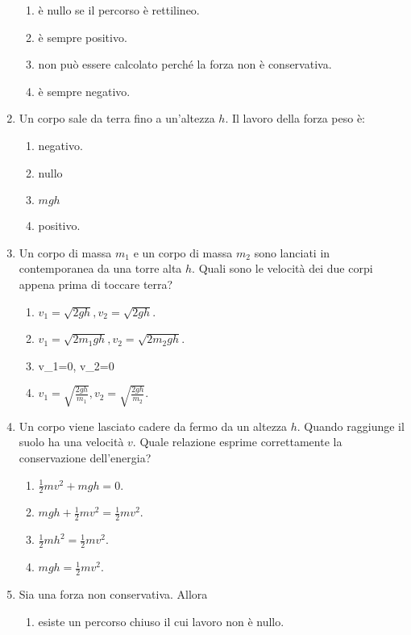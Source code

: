 \documentclass{article}
\begin{document}
\begin{enumerate}
  \begin{enumerate}[label=\Alph*.]
    \item è nullo se il percorso è rettilineo.
    \item è sempre positivo.
    \item non può essere calcolato perché la forza non è conservativa.
    \item è sempre negativo.
  \end{enumerate}
  \item Un corpo sale da terra fino a un'altezza $h$. Il lavoro della forza peso è:
  \begin{enumerate}[label=\Alph*.]
    \item negativo.
    \item nullo
    \item $mgh$
    \item positivo.
  \end{enumerate}
  \item Un corpo di massa $m_1$ e un corpo di massa $m_2$ sono lanciati in contemporanea da una torre alta $h$. Quali sono le velocità dei due corpi appena prima di toccare terra?
  \begin{enumerate}[label=\Alph*.]
    \item $v_1=\sqrt{2gh}, v_2=\sqrt{2gh}$.
    \item $v_1=\sqrt{2m_1gh}, v_2=\sqrt{2m_2gh}$.
    \item v_1=0, v_2=0
    \item $v_1=\sqrt{\frac{2gh}{m_1}}, v_2=\sqrt{\frac{2gh}{m_2}}$.
  \end{enumerate}
  \item Un corpo viene lasciato cadere da fermo da un altezza $h$. Quando raggiunge il suolo ha una velocità $v$. Quale relazione esprime correttamente la conservazione dell'energia?
  \begin{enumerate}[label=\Alph*.]
    \item $\frac{1}{2}mv^2+mgh=0.$
    \item $mgh+\frac{1}{2}mv^2=\frac{1}{2}mv^2.$
    \item $\frac{1}{2}mh^2=\frac{1}{2}mv^2$.
    \item $mgh=\frac{1}{2}mv^2$.
  \end{enumerate}
  \item Sia  una forza non conservativa. Allora
  \begin{enumerate}[label=\Alph*.]
    \item esiste un percorso chiuso il cui lavoro non è nullo.

\end{enumerate}
\end{enumerate}
\end{document}
